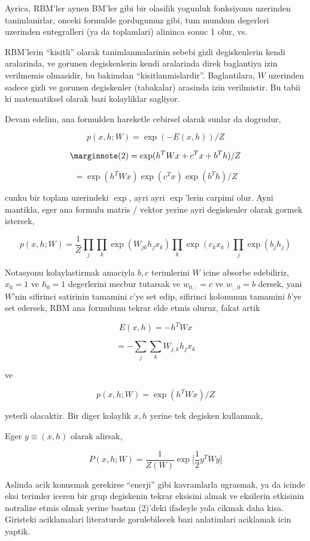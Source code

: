 \documentclass[12pt,fleqn]{article}\usepackage{../common}
\begin{document}
Ayrica, RBM'ler aynen BM'ler gibi bir olasilik yogunluk fonksiyonu
uzerinden tanimlanirlar, onceki formulde gordugumuz gibi, tum mumkun
degerleri uzerinden entegralleri (ya da toplamlari) alininca sonuc 1 olur,
vs.

RBM'lerin ``kisitli'' olarak tanimlanmalarinin sebebi gizli degiskenlerin
kendi aralarinda, ve gorunen degiskenlerin kendi aralarinda direk
baglantiya izin verilmemis olmasidir, bu bakimdan
``kisitlanmislardir''. Baglantilara, $W$ uzerinden sadece gizli ve gorunen
degiskenler (tabakalar) arasinda izin verilmistir. Bu tabii ki matematiksel
olarak bazi kolayliklar sagliyor.

Devam edelim, ana formulden hareketle cebirsel olarak sunlar da dogrudur,

$$ p(x,h;W) = \exp (-E(x,h)) / Z $$

$$ 
\mlabel{2}
= \exp (h^TWx + c^Tx + b^Th ) / Z $$

$$ = \exp (h^TWx) \exp (c^Tx) \exp(b^Th) / Z $$

cunku bir toplam uzerindeki $\exp$, ayri ayri $\exp$'lerin carpimi
olur. Ayni mantikla, eger ana formulu matris / vektor yerine ayri
degiskenler olarak gormek istersek,

$$ 
p(x,h;W) = \frac{1}{Z}
\prod_j \prod_k \exp (W_{jk}h_jx_k) \prod_k \exp(c_kx_k) \prod_j \exp(b_jh_j) 
 $$

Notasyonu kolaylastirmak amaciyla $b,c$ terimlerini $W$ icine absorbe
edebiliriz, $x_0=1$ ve $h_0=1$ degerlerini mecbur tutarsak ve $w_{0,:}=c$
ve $w_{:,0}=b$ dersek, yani $W$'nin sifirinci satirinin tamamini $c$'ye set
edip, sifirinci kolonunun tamamini $b$'ye set edersek, RBM ana formulunu
tekrar elde etmis oluruz, fakat artik 

$$ E(x,h) = -h^TWx $$


$$ = - \sum_j \sum_k W_{j,k}h_jx_k  $$

ve

$$ p(x,h;W)  = \exp (h^TWx) / Z $$

yeterli olacaktir. Bir diger kolaylik $x,h$ yerine tek degisken kullanmak,

Eger $y \equiv (x,h)$ olarak alirsak, 


$$ P(x,h;W) = \frac{1}{Z(W)} \exp 
\bigg[ 
\frac{1}{2} y^T W y
\bigg]
$$

Aslinda acik konusmak gerekirse ``enerji'' gibi kavramlarla ugrasmak, ya da
icinde eksi terimler iceren bir grup degiskenin tekrar eksisini almak ve
eksilerin etkisinin notralize etmis olmak yerine bastan (2)'deki ifadeyle
yola cikmak daha kisa. Giristeki aciklamalari literaturde gorulebilecek
bazi anlatimlari aciklamak icin yaptik. 
\end{document}
